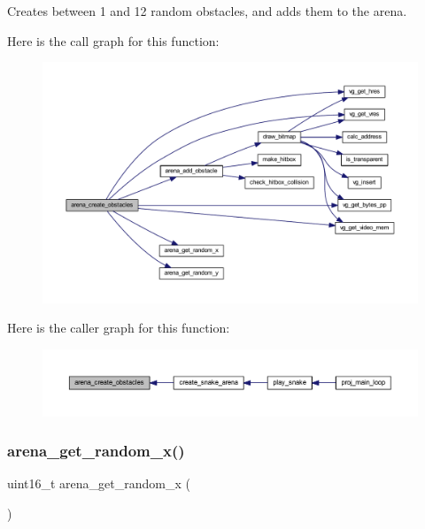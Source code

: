 Creates between 1 and 12 random obstacles, and adds them to the arena. 

Here is the call graph for this function\+:\nopagebreak
\begin{figure}[H]
\begin{center}
\leavevmode
\includegraphics[width=350pt]{group__snake_ga0023b72115390a70c136c27bcd0f7844_cgraph}
\end{center}
\end{figure}
Here is the caller graph for this function\+:\nopagebreak
\begin{figure}[H]
\begin{center}
\leavevmode
\includegraphics[width=350pt]{group__snake_ga0023b72115390a70c136c27bcd0f7844_icgraph}
\end{center}
\end{figure}
\mbox{\label{group__snake_gaf1c909afe83fd09c4650ea8a0413fbf2}} 
\subsubsection{\texorpdfstring{arena\+\_\+get\+\_\+random\+\_\+x()}{arena\_get\_random\_x()}}
{\footnotesize\ttfamily uint16\+\_\+t arena\+\_\+get\+\_\+random\+\_\+x (\begin{DoxyParamCaption}{ }\end{DoxyParamCaption})}


